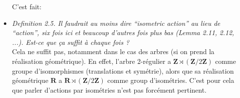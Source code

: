 \documentclass[a4paper]{article}
\theoremstyle{definition}
\newcommand*{\field}[1]{\mathbf{#1}}
\newcommand*{\Z}{\field{Z}}
\begin{document}
\begin{itemize}
C'est fait: \cite{MR2240370}
\item
\textit{
Definition 2.5. Il faudrait au moins dire “isometric action” au lieu de “action”, six fois ici et beaucoup d’autres fois plus bas (Lemma 2.11, 2.12, ...). Est-ce que ça suffit à chaque fois ?}\\
Cela ne suffit pas, notamment dans le cas des arbres (si on prend la réalisation géométrique). En effet, l'arbre 2-régulier a $\mathbf Z\rtimes(\Z/2\Z)$ comme groupe d'isomorphismes (translations et symétrie), alors que sa réalisation géométrique $\mathbf R$ a $\mathbf R\rtimes(\Z/2\Z)$ comme group d'isométries. C'est pour cela que parler d'actions par isométries n'est pas forcément pertinent.
\end{itemize}
%
%
%
%
%
%
%
%
%
%
\end{document}
